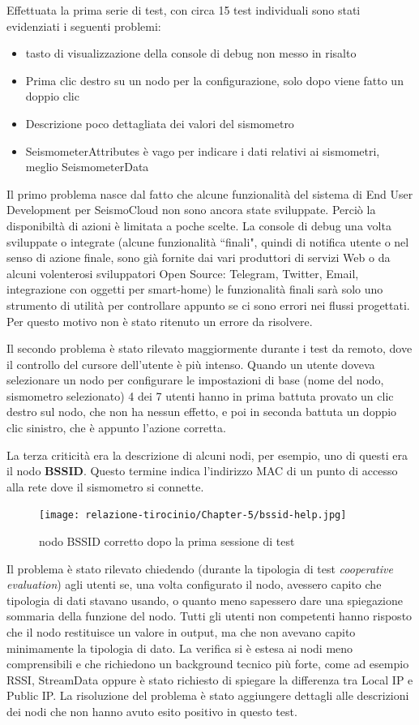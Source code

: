 \documentclass[a4paper,10pt]{memoir}
\begin{document}
Effettuata la prima serie di test, con circa 15 test individuali sono stati evidenziati i seguenti problemi:

\begin{itemize}
    \item tasto di visualizzazione della console di debug non messo in risalto
    \item Prima clic destro su un nodo per la configurazione, solo dopo viene fatto un doppio clic
    \item Descrizione poco dettagliata dei valori del sismometro
    \item SeismometerAttributes è vago per indicare i dati relativi ai sismometri, meglio SeismometerData
\end{itemize}

Il primo problema nasce dal fatto che alcune funzionalità del sistema di End User Development per SeismoCloud non sono ancora state sviluppate. Perciò la disponibiltà di azioni è limitata a poche scelte. La console di debug una volta sviluppate o integrate (alcune funzionalità ``finali", quindi di notifica utente o nel senso di azione finale, sono già fornite dai vari produttori di servizi Web o da alcuni volenterosi sviluppatori Open Source: Telegram, Twitter, Email, integrazione con oggetti per smart-home) le funzionalità finali sarà solo uno strumento di utilità per controllare appunto se ci sono errori nei flussi progettati. Per questo motivo non è stato ritenuto un errore da risolvere.

Il secondo problema è stato rilevato maggiormente durante i test da remoto, dove il controllo del cursore dell'utente è più intenso. Quando un utente doveva selezionare un nodo per configurare le impostazioni di base (nome del nodo, sismometro selezionato) 4 dei 7 utenti hanno in prima battuta provato un clic destro sul nodo, che non ha nessun effetto, e poi in seconda battuta un doppio clic sinistro, che è appunto l'azione corretta.

La terza criticità era la descrizione di alcuni nodi, per esempio, uno di questi era il nodo \textbf{BSSID}. Questo termine indica l'indirizzo MAC di un punto di accesso alla rete dove il sismometro si connette.
\begin{figure}[ht]
    \centering
    \texttt{[image: relazione-tirocinio/Chapter-5/bssid-help.jpg]}
    \caption{nodo BSSID corretto dopo la prima sessione di test}
    \label{fig:bssid-help}
\end{figure}
Il problema è stato rilevato chiedendo (durante la tipologia di test \textit{cooperative evaluation}) agli utenti se, una volta configurato il nodo, avessero capito che tipologia di dati stavano usando, o quanto meno sapessero dare una spiegazione sommaria della funzione del nodo.
Tutti gli utenti non competenti hanno risposto che il nodo restituisce un valore in output, ma che non avevano capito minimamente la tipologia di dato.
La verifica si è estesa ai nodi meno comprensibili e che richiedono un background tecnico più forte, come ad esempio RSSI, StreamData oppure è stato richiesto di spiegare la differenza tra Local IP e Public IP.
La risoluzione del problema è stato aggiungere dettagli alle descrizioni dei nodi che non hanno avuto esito positivo in questo test.
\end{document}

